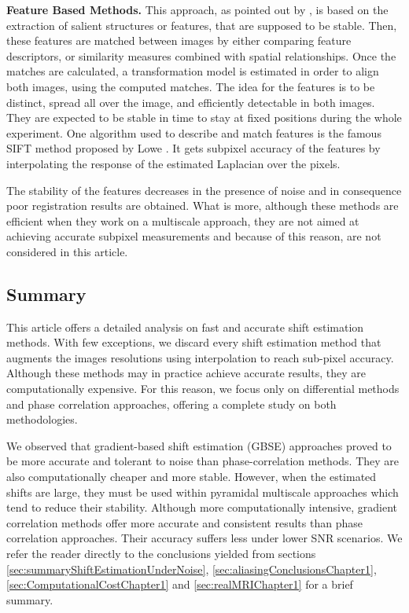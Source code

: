{\bf Feature Based Methods.} This approach, as pointed out by \cite{Zitova03imageregistration}, is based on the extraction of salient structures or features, that are supposed to be stable. Then, these features are matched between images by either comparing feature descriptors, or similarity measures combined with spatial relationships. Once the matches are calculated, a transformation model is estimated in order to align both images, using the computed matches. The idea for the features is to be distinct, spread all over the image, and efficiently detectable in both images. They are expected to be stable in time to stay at fixed positions during the whole experiment. One algorithm used to describe and match features is the famous SIFT method proposed by Lowe \cite{Lowe2004}. It gets subpixel accuracy of the features by interpolating the response of the estimated Laplacian over the pixels.

The stability of the features decreases in the presence of noise and in consequence poor registration results are obtained.  
What is more, although these methods are efficient when they work on a multiscale approach, they are not aimed at achieving accurate subpixel measurements and because of this reason, are not considered in this article.

\subsection{Summary}
This article offers a detailed analysis on fast and accurate shift estimation methods. With few exceptions, we discard every shift estimation method that augments the images resolutions using interpolation to reach sub-pixel accuracy. Although these methods may in practice achieve accurate results, they are computationally expensive. For this reason, we focus only on differential methods and phase correlation approaches, offering a complete study on both methodologies.

We observed that gradient-based shift estimation (GBSE) approaches proved to be more accurate and tolerant to noise than phase-correlation methods. They are also computationally cheaper and more stable. However, when the estimated shifts are large, they must be used within pyramidal multiscale approaches which tend to reduce their stability. Although more computationally intensive, gradient correlation methods offer more accurate and consistent results than phase correlation approaches. Their accuracy suffers less under lower SNR scenarios. We refer the reader directly to the conclusions yielded from sections \ref{sec:summaryShiftEstimationUnderNoise}, \ref{sec:aliasingConclusionsChapter1}, \ref{sec:ComputationalCostChapter1} and \ref{sec:realMRIChapter1} for a brief summary.

